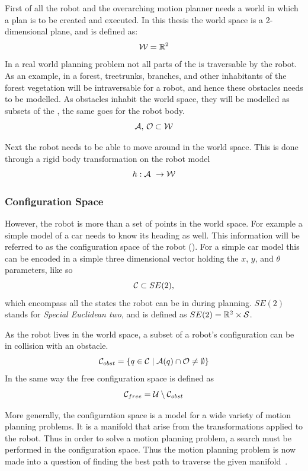 First of all the robot and the overarching motion planner needs a world in which
a plan is to be created and executed. In this thesis the world space is a
2-dimensional plane, and is defined as:
\[
  \mathcal{W} = \mathbb{R}^2
\]
In a real world planning problem not all parts of the \modelworld{} is
traversable by the robot. As an example, in a forest, treetrunks, branches, and
other inhabitants of the forest vegetation will be intraversable for a robot,
and hence these obstacles needs to be modelled. As obstacles inhabit the world
space, they will be modelled as subsets of the \modelworld, the same goes for
the robot body.
\[
  \mathcal{A},\, \mathcal{O} \subset \mathcal{W}
\]

Next the robot needs to be able to move around in the world space. This is done
through a rigid body transformation on the robot model
\[
  h : \mathcal{A}\ \rightarrow \mathcal{W}
\]


\subsubsection{Configuration Space}

However, the robot is more than a set of points in the world space. For example
a simple model of a car needs to know its heading as well. This information will
be referred to as the configuration space of the robot
(\modelconfigurationspace). For a simple car model this can be encoded in a
simple three dimensional vector holding the \(x\), \(y\), and \(\theta\)
parameters, like so
\[
  \mathcal{C} \subset SE(2),
\]
which encompass all the states the robot can be in during planning. \(SE(2)\)
stands for \textit{Special Euclidean two}, and is defined as \(SE(2) = \mathbb{R}^2
\times \mathcal{S}\).

As the robot lives in the world space, a subset of a robot's configuration can
be in collision with an obstacle.
\[
  \mathcal{C}_{obst}{} = \lbrace q \in \mathcal{C}{} \mid
    \mathcal{A}(q) \cap \mathcal{O}{} \neq \emptyset\rbrace
\]
In the same way the free configuration space is defined as
\[
  \mathcal{C}_{free}{} = \mathcal{U} \setminus
  \mathcal{C}_{obst}{}
\]

More generally, the configuration space is a model for a wide variety of motion
planning problems. It is a manifold that arise from the transformations applied
to the robot. Thus in order to solve a motion planning problem, a search must be
performed in the configuration space. Thus the motion planning problem is now
made into a question of finding the best path to traverse the given
manifold~\cite{Lav06}.

